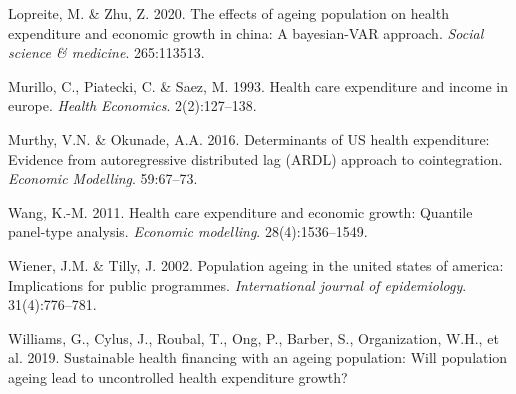 \documentclass[11pt,preprint, authoryear]{elsarticle}
\numberwithin{equation}{section}
\numberwithin{figure}{section}
\numberwithin{table}{section}
\newlength{\cslhangindent}
\newenvironment{CSLReferences}%
  {\setlength{\parindent}{0pt}%
  \everypar{\setlength{\hangindent}{\cslhangindent}}\ignorespaces}%
  {\par}
\begin{document}
\begin{CSLReferences}{1}{0}
\leavevmode{}%
Lopreite, M. \& Zhu, Z. 2020. The effects of ageing population on health
expenditure and economic growth in china: A bayesian-VAR approach.
\emph{Social science \& medicine}. 265:113513.

\leavevmode{}%
Murillo, C., Piatecki, C. \& Saez, M. 1993. Health care expenditure and
income in europe. \emph{Health Economics}. 2(2):127--138.

\leavevmode{}%
Murthy, V.N. \& Okunade, A.A. 2016. Determinants of US health
expenditure: Evidence from autoregressive distributed lag (ARDL)
approach to cointegration. \emph{Economic Modelling}. 59:67--73.

\leavevmode{}%
Wang, K.-M. 2011. Health care expenditure and economic growth: Quantile
panel-type analysis. \emph{Economic modelling}. 28(4):1536--1549.

\leavevmode{}%
Wiener, J.M. \& Tilly, J. 2002. Population ageing in the united states
of america: Implications for public programmes. \emph{International
journal of epidemiology}. 31(4):776--781.

\leavevmode{}%
Williams, G., Cylus, J., Roubal, T., Ong, P., Barber, S., Organization,
W.H., et al. 2019. Sustainable health financing with an ageing
population: Will population ageing lead to uncontrolled health
expenditure growth?

\end{CSLReferences}

\newpage
\appendix
\renewcommand{\thesection}{Appendix A}

\hypertarget{section}{%
\section{\texorpdfstring{\label{aa}}{}}\label{section}}
\end{document}
